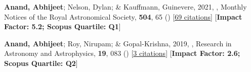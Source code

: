 \item[{\color{numcolor}\scriptsize2}] \textbf{Anand, Abhijeet}; Nelson, Dylan; \& Kauffmann, Guinevere, 2021, , Monthly Notices of the Royal Astronomical Society, \textbf{504}, 65 () [\href{https://ui.adsabs.harvard.edu/abs/2021MNRAS.504...65A}{69 citations}] [\textbf{Impact Factor: 5.2; Scopus Quartile: Q1}]

\item[{\color{numcolor}\scriptsize1}] \textbf{Anand, Abhijeet}; Roy, Nirupam; \& Gopal-Krishna, 2019, , Research in Astronomy and Astrophysics, \textbf{19}, 083 () [\href{https://ui.adsabs.harvard.edu/abs/2019RAA....19...83A}{3 citations}] [\textbf{Impact Factor: 2.6; Scopus Quartile: Q2}]